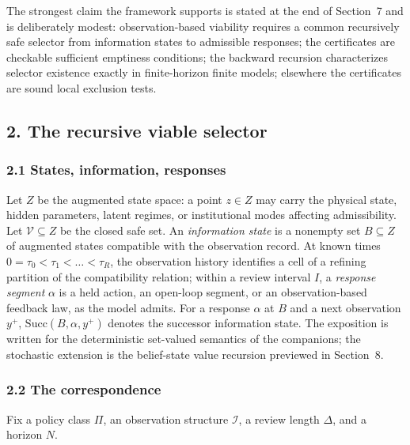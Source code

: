 \documentclass[10pt,twocolumn]{article}
\theoremstyle{definition}
\begin{document}
The strongest claim the framework supports is stated at the end of
Section~7 and is deliberately modest: observation-based viability requires a
common recursively safe selector from information states to admissible
responses; the certificates are checkable sufficient emptiness conditions;
the backward recursion characterizes selector existence exactly in
finite-horizon finite models; elsewhere the certificates are sound local
exclusion tests.

\subsection{2. The recursive viable selector}\label{selector}

\subsubsection{2.1 States, information, responses}\label{model}

Let \(Z\) be the augmented state space: a point \(z \in Z\) may carry the
physical state, hidden parameters, latent regimes, or institutional modes
affecting admissibility. Let \(\mathcal{V} \subseteq Z\) be the closed safe
set. An \emph{information state} is a nonempty set
\(B \subseteq Z\) of augmented states compatible with the observation
record. At known times \(0 = \tau_0 < \tau_1 < \dots < \tau_R\), the
observation history identifies a cell of a refining partition of the
compatibility relation; within a review interval \(I\), a \emph{response
segment} \(\alpha\) is a held action, an open-loop segment, or an
observation-based feedback law, as the model admits. For a response
\(\alpha\) at \(B\) and a next observation \(y^{+}\),
\(\mathrm{Succ}(B, \alpha, y^{+})\) denotes the successor information state.
The exposition is written for the deterministic set-valued semantics of the
companions; the stochastic extension is the belief-state value recursion
previewed in Section~8.

\subsubsection{2.2 The correspondence}\label{gamma}

Fix a policy class \(\Pi\), an observation structure
\(\mathcal{I}\), a review length \(\Delta\), and a horizon \(N\).
\end{document}
